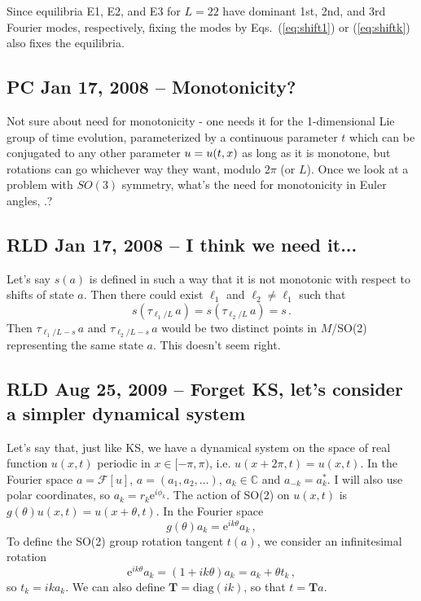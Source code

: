 \documentclass[letter,10pt]{article}
\begin{document}
Since equilibria E1, E2, and E3 for $L = 22$ have dominant
1st, 2nd, and 3rd Fourier modes, respectively, fixing the modes by
Eqs.~(\ref{eq:shift1}) or (\ref{eq:shiftk}) also fixes the equilibria.


\subsection{PC Jan 17, 2008 -- Monotonicity?}

Not sure about need for monotonicity - one needs it for the 1-dimensional
Lie group of time evolution, parameterized by a continuous parameter $t$
which can be conjugated to any other parameter $u = u(t,x)$ as long
as it is monotone, but rotations can go whichever way they want, modulo
$2\pi$ (or $L$). Once we look at a problem with $SO(3)$ symmetry, what's the
need for monotonicity in Euler angles, \etc.?

\subsection{RLD Jan 17, 2008 -- I think we need it...}
Let's say $s(a)$ is defined in such a way that it is not monotonic with respect to
shifts of state $a$.  Then there could exist $\ell_1$ and $\ell_2 \neq \ell_1$ such that
\[ s(\tau_{\ell_1/L}\,a) = s(\tau_{\ell_2/L}\,a) = s\,. \]
Then $\tau_{\ell_1/L - s}\,a$ and $\tau_{\ell_2/L - s}\,a$ would be two distinct points
in $M$/SO(2) representing the same state $a$.  This doesn't seem right.

\subsection{RLD Aug 25, 2009 -- Forget KS, let's consider a simpler dynamical system}

Let's say that, just like KS, we have a dynamical system on the space of real function $u(x,t)$ periodic in $x \in [-\pi, \pi)$, i.e. $u(x+2\pi,t) = u(x,t)$.  In the Fourier space $a = \mathcal{F}[u]$, $a = (a_1, a_2, \ldots)$, $a_k \in \mathbb{C}$ and $a_{-k} = a_k^\ast$.
I will also use polar coordinates, so $a_k = r_k \mathrm{e}^{i \phi_k}$.
The action of SO(2) on $u(x,t)$ is $g(\theta) u(x,t) = u(x+\theta,t)$. In the Fourier space
\[ g(\theta) a_k = \mathrm{e}^{ik\theta}a_k\,, \]
To define the SO(2) group rotation tangent $t(a)$, we consider an infinitesimal rotation
\[ \mathrm{e}^{ik\theta}a_k = (1 + ik\theta)a_k  = a_k + \theta t_k\,, \]
so $t_k = ika_k$.  We can also define $\mathbf{T} = \mathrm{diag}(ik)$, so that $t = \mathbf{T}a$.
\end{document}
